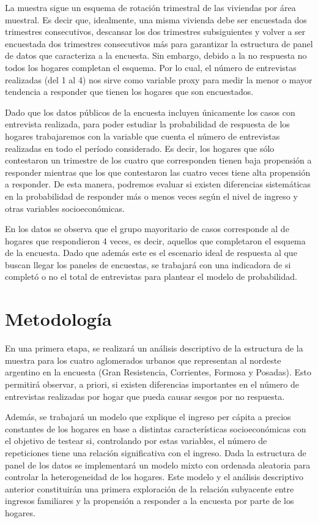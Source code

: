 \documentclass{article}
\begin{document}
La muestra sigue un esquema de rotación trimestral de las viviendas por área muestral. Es decir que, idealmente, una misma vivienda debe ser encuestada dos trimestres consecutivos, descansar los dos trimestres subsiguientes y volver a ser encuestada dos trimestres consecutivos más para garantizar la estructura de panel de datos que caracteriza a la encuesta. Sin embargo, debido a la no respuesta no todos los hogares completan el esquema. Por lo cual, el número de entrevistas realizadas (del 1 al 4) nos sirve como variable proxy para medir la menor o mayor tendencia a responder que tienen los hogares que son encuestados.

Dado que los datos públicos de la encuesta incluyen únicamente los casos con entrevista realizada, para poder estudiar la probabilidad de respuesta de los hogares trabajaremos con la variable que cuenta el número de entrevistas realizadas en todo el período considerado. Es decir, los hogares que sólo contestaron un trimestre de los cuatro que corresponden tienen baja propensión a responder mientras que los que contestaron las cuatro veces tiene alta propensión a responder. De esta manera, podremos evaluar si existen diferencias sistemáticas en la probabilidad de responder más o menos veces según el nivel de ingreso y otras variables socioeconómicas.

En los datos se observa que el grupo mayoritario de casos corresponde al de hogares que respondieron 4 veces, es decir, aquellos que completaron el esquema de la encuesta. Dado que además este es el escenario ideal de respuesta al que buscan llegar los paneles de encuestas, se trabajará con una indicadora de si completó o no el total de entrevistas para plantear el modelo de probabilidad.


\section{Metodología}

En una primera etapa, se realizará un análisis descriptivo de la estructura de la muestra para los cuatro aglomerados urbanos que representan al nordeste argentino en la encuesta (Gran Resistencia, Corrientes, Formosa y Posadas). Esto permitirá observar, a priori, si existen diferencias importantes en el número de entrevistas realizadas por hogar que pueda causar sesgos por no respuesta.

Además, se trabajará un modelo que explique el ingreso per cápita a precios constantes de los hogares en base a distintas características socioeconómicas con el objetivo de testear si, controlando por estas variables, el número de repeticiones tiene una relación significativa con el ingreso. Dada la estructura de panel de los datos se implementará un modelo mixto con ordenada aleatoria para controlar la heterogeneidad de los hogares. Este modelo y el análisis descriptivo anterior constituirán una primera exploración de la relación subyacente entre ingresos familiares y la propensión a responder a la encuesta por parte de los hogares.
\end{document}
